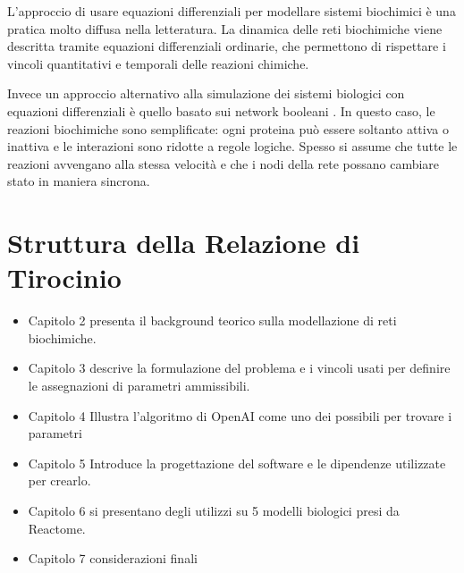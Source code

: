 L'approccio di usare equazioni differenziali per modellare sistemi biochimici è una pratica molto diffusa nella letteratura. La dinamica delle reti biochimiche viene descritta tramite equazioni differenziali ordinarie, che permettono di rispettare i vincoli quantitativi e temporali delle reazioni chimiche.

Invece un approccio alternativo alla simulazione dei sistemi biologici con equazioni differenziali è quello basato sui network booleani \cite{boolean_network1} \cite{boolean_network2} \cite{boolean_network3}. In questo caso, le reazioni biochimiche sono semplificate: ogni proteina può essere soltanto attiva o inattiva e le interazioni sono ridotte a regole logiche. Spesso si assume che tutte le reazioni avvengano alla stessa velocità e che i nodi della rete possano cambiare stato in maniera sincrona.

\section{Struttura della Relazione di Tirocinio}

\begin{itemize} %
    \item Capitolo 2 presenta il background teorico sulla modellazione di reti biochimiche.
    \item Capitolo 3 descrive la formulazione del problema e i vincoli usati per definire le assegnazioni di parametri ammissibili.
    \item Capitolo 4 Illustra l'algoritmo di OpenAI come uno dei possibili per trovare i parametri
    \item Capitolo 5 Introduce la progettazione del software e le dipendenze utilizzate per crearlo.
    \item Capitolo 6 si presentano degli utilizzi su 5 modelli biologici presi da Reactome.
    \item Capitolo 7 considerazioni finali
\end{itemize}